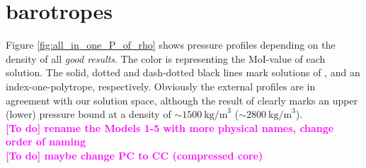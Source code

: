 \documentclass[usenatbib]{mnras}
\newcommand{\TD}[1]{\textcolor{magenta}{\bf [To do] #1}}
\newcommand{\sub}[1]{_{\text{#1}}}
\begin{document}
\section{barotropes}
Figure \ref{fig:all_in_one_P_of_rho} shows pressure profiles depending on the density of all \textit{good results}. The color is representing the MoI-value of each solution. The solid, dotted and dash-dotted black lines mark solutions of \cite{Miguel2016}, \cite{Debras_2019} and an index-one-polytrope, respectively. Obviously the external profiles are in agreement with our solution space, although the result of \cite{Debras_2019} clearly marks an upper (lower) pressure bound at a density of $\sim{1500~\text{kg/m}^3}$ ($\sim{2800~\text{kg/m}^3}$). \\
\TD{rename the Models 1-5 with more physical names, change order of naming} \\
\TD{maybe change PC to CC (compressed core)} \\

\bsp %
\label{lastpage}
\end{document}
